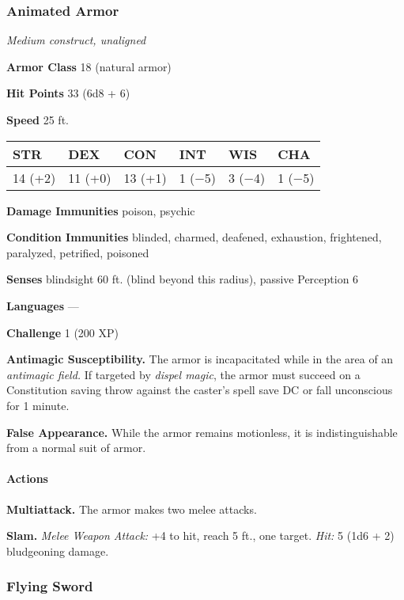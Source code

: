 \documentclass[
]{article}
\begin{document}
\hypertarget{animated-armor}{%
\subsubsection{Animated Armor}\label{animated-armor}}

\emph{Medium construct, unaligned}

\textbf{Armor Class} 18 (natural armor)

\textbf{Hit Points} 33 (6d8 + 6)

\textbf{Speed} 25 ft.

\begin{longtable}[]{@{}llllll@{}}
\toprule
STR & DEX & CON & INT & WIS & CHA\tabularnewline
\midrule
\endhead
14 (+2) & 11 (+0) & 13 (+1) & 1 (−5) & 3 (−4) & 1 (−5)\tabularnewline
\bottomrule
\end{longtable}

\textbf{Damage Immunities} poison, psychic

\textbf{Condition Immunities} blinded, charmed, deafened, exhaustion,
frightened, paralyzed, petrified, poisoned

\textbf{Senses} blindsight 60 ft. (blind beyond this radius), passive
Perception 6

\textbf{Languages} ---

\textbf{Challenge} 1 (200 XP)

\textbf{Antimagic Susceptibility.} The armor is incapacitated while in
the area of an \emph{antimagic field.} If targeted by \emph{dispel
magic}, the armor must succeed on a Constitution saving throw against
the caster's spell save DC or fall unconscious for 1 minute.

\textbf{False Appearance.} While the armor remains motionless, it is
indistinguishable from a normal suit of armor.

\hypertarget{actions-4}{%
\paragraph{Actions}\label{actions-4}}

\textbf{Multiattack.} The armor makes two melee attacks.

\textbf{Slam.} \emph{Melee Weapon Attack:} +4 to hit, reach 5 ft., one
target. \emph{Hit:} 5 (1d6 + 2) bludgeoning damage.

\hypertarget{flying-sword}{%
\subsubsection{Flying Sword}\label{flying-sword}}
\end{document}
